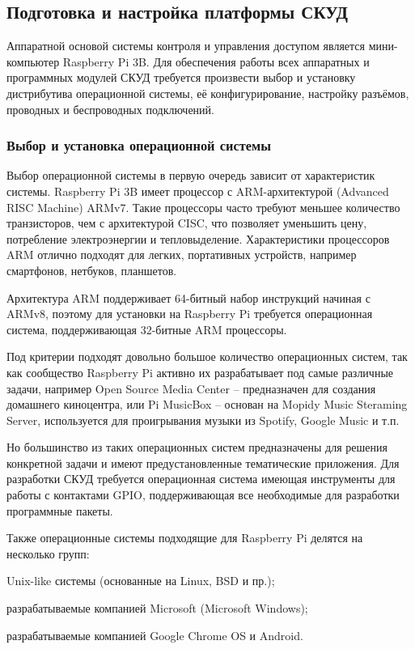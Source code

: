 \subsection{Подготовка и настройка платформы СКУД}

Аппаратной основой системы контроля и управления доступом является мини-компьютер Raspberry Pi 3B. Для обеспечения работы всех аппаратных и программных модулей СКУД требуется произвести выбор и установку дистрибутива операционной системы, её конфигурирование, настройку разъёмов, проводных и беспроводных подключений.

\subsubsection{Выбор и установка операционной системы}

Выбор операционной системы в первую очередь зависит от характеристик системы. Raspberry Pi 3B имеет процессор с ARM-архитектурой (Advanced RISC Machine) ARMv7. Такие процессоры часто требуют меньшее количество транзисторов, чем с архитектурой CISC, что позволяет уменьшить цену, потребление электроэнергии и тепловыделение. Характеристики процессоров  ARM отлично подходят для легких, портативных устройств, например смартфонов, нетбуков, планшетов. 

Архитектура ARM поддерживает 64-битный набор инструкций начиная с ARMv8, поэтому для установки на Raspberry Pi требуется операционная система, поддерживающая 32-битные ARM процессоры.

Под критерии подходят довольно большое количество операционных систем, так как
сообщество Raspberry Pi активно их разрабатывает под самые различные задачи,
например Open Source Media Center -- предназначен для создания домашнего
киноцентра, или Pi MusicBox -- основан на Mopidy Music Steraming Server,
используется для проигрывания музыки из Spotify, Google Music и т.п.
\cite{pi-os}

Но большинство из таких операционных систем предназначены для решения конкретной задачи и имеют предустановленные тематические приложения. Для разработки СКУД требуется операционная система имеющая инструменты для работы с контактами GPIO, поддерживающая все необходимые для разработки программные пакеты.

Также операционные системы подходящие для Raspberry Pi делятся на несколько групп: 
\begin{itemize*}
\item Unix-like системы (основанные на Linux, BSD и пр.);
\item разрабатываемые компанией Microsoft (Microsoft Windows);
\item разрабатываемые компанией Google Chrome OS и Android.
\end{itemize*}

